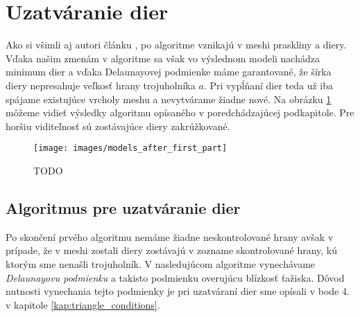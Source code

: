 \section{Uzatváranie dier}
\label{kap:second_part_of_algorithm}
Ako si všimli aj autori článku \cite{akkouche2001adaptive}, po algoritme vznikajú v meshi 
praskliny a diery. Vďaka našim zmenám v algoritme sa však vo výslednom modeli nachádza minimum dier 
a vďaka Delaunayovej podmienke máme garantované, že šírka diery nepresahuje veľkosť hrany trojuholníka
$a$. Pri vypĺňaní dier teda už iba spájame existujúce vrcholy meshu a nevytvárame žiadne nové.
Na obrázku \ref{obr:models_after_first_part} môžeme vidieť výsledky algoritmu opísaného v 
poredchádzajúcej podkapitole. Pre horšiu viditeľnosť sú zostávajúce diery zakrúžkované.

\begin{figure}
    \centerline{\texttt{[image: images/models\_after\_first\_part]}}
    \caption[TODO]{TODO}
    \label{obr:models_after_first_part}
\end{figure}

\subsection{Algoritmus pre uzatváranie dier}

Po skončení prvého algoritmu nemáme žiadne neskontrolované hrany avšak v prípade, že v meshi zostali 
diery zostávajú v zozname skontrolované hrany, kú ktorým sme nenašli trojuholník. V nasledujúcom 
algoritme vynechávame \textit{Delaunayovu podmienku} a takisto podmienku overujúcu blízkosť ťažiska. 
Dôvod nutnosti vynechania tejto podmienky je pri uzatváraní dier sme opísali v bode 4. v kapitole 
\ref{kap:triangle_conditions}.

